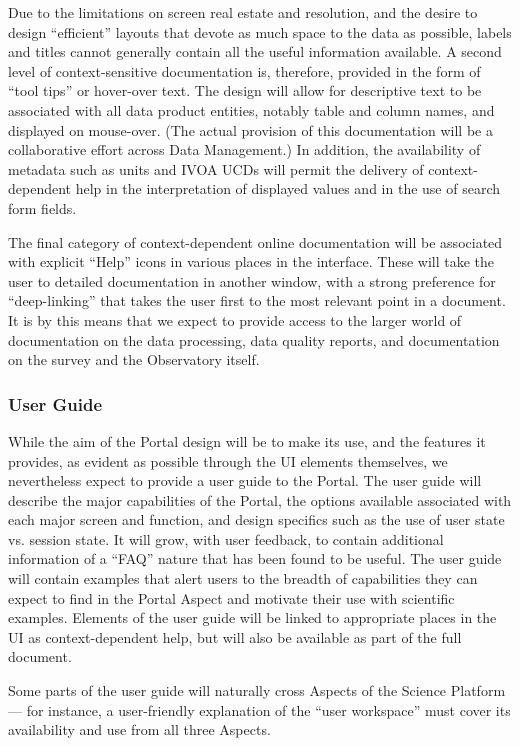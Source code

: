 Due to the limitations on screen real estate and resolution, and the desire to design ``efficient'' layouts that devote as much space to the data as possible, labels and titles cannot generally contain all the useful information available.
A second level of context-sensitive documentation is, therefore, provided in the form of ``tool tips'' or hover-over text.
The design will allow for descriptive text to be associated with all data product entities, notably table and column names, and displayed on mouse-over.
(The actual provision of this documentation will be a collaborative effort across Data Management.)
In addition, the availability of metadata such as units and IVOA UCDs will permit the delivery of context-dependent help in the interpretation of displayed values and in the use of search form fields.

The final category of context-dependent online documentation will be associated with explicit ``Help'' icons in various places in the interface.
These will take the user to detailed documentation in another window, with a strong preference for ``deep-linking'' that takes the user first to the most relevant point in a document.
It is by this means that we expect to provide access to the larger world of documentation on the data processing, data quality reports, and documentation on the survey and the Observatory itself.

\subsubsection{User Guide}\label{user-guide}

While the aim of the Portal design will be to make its use, and the features it provides, as evident as possible through the UI elements themselves, we nevertheless expect to provide a user guide to the Portal.
The user guide will describe the major capabilities of the Portal, the options available associated with each major screen and function, and design specifics such as the use of user state vs. session state.
It will grow, with user feedback, to contain additional information of a ``FAQ'' nature that has been found to be useful.
The user guide will contain examples that alert users to the breadth of capabilities they can expect to find in the Portal Aspect and motivate their use with scientific examples.
Elements of the user guide will be linked to appropriate places in the UI as context-dependent help, but will also be available as part of the full document.

Some parts of the user guide will naturally cross Aspects of the Science Platform --- for instance, a user-friendly explanation of the ``user workspace'' must cover its availability and use from all three Aspects.

